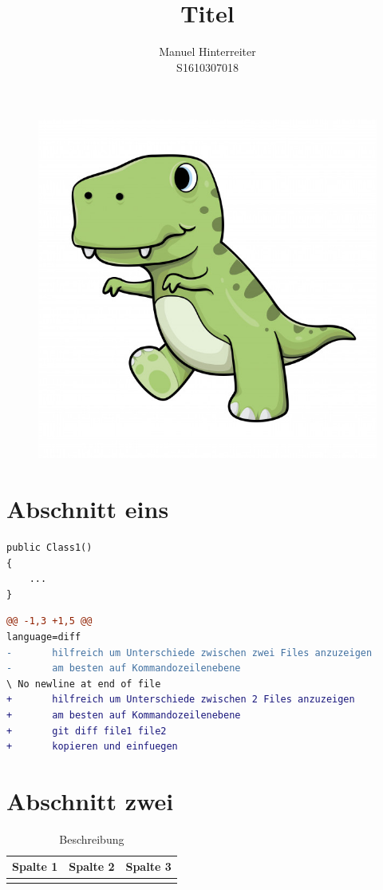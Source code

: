 \documentclass[12pt]{article}
\title{Titel} %
\author{Manuel Hinterreiter\\S1610307018}
\begin{document}
%
\maketitle

\begin{figure}[h!]
  \centering
  \includegraphics[scale=0.5]{trex}
\end{figure}

\tableofcontents
\newpage
\section{Abschnitt eins}
\begin{lstlisting}[caption=Class1.cs]
public Class1()
{
    ...
}
\end{lstlisting}

\begin{lstlisting}[language=diff, caption=Diff.cs]
@@ -1,3 +1,5 @@
language=diff
-       hilfreich um Unterschiede zwischen zwei Files anzuzeigen
-       am besten auf Kommandozeilenebene
\ No newline at end of file
+       hilfreich um Unterschiede zwischen 2 Files anzuzeigen
+       am besten auf Kommandozeilenebene
+       git diff file1 file2
+       kopieren und einfuegen
\end{lstlisting}

\section{Abschnitt zwei}
\begin{table}[h!]
  \centering
  \begin{tabular}{|p{2.5cm}||p{4cm}|p{4cm}|}
    \hline
     \textbf{Spalte 1} & \textbf{Spalte 2} & \textbf{Spalte 3} \\
     \hline
     &&\\
     \hline
   \end{tabular}
   \caption{Beschreibung}
   \label{tab:table1}
\end{table}
\end{document}
